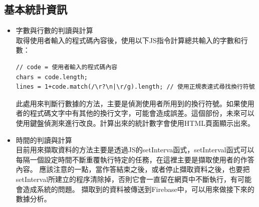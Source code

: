 \subsection{基本統計資訊}
\begin{itemize}
	\item 字數與行數的判讀與計算\\
	取得使用者輸入的程式碼內容後，使用以下JS指令計算總共輸入的字數和行數：

\begin{lstlisting}[caption=js字數與行數的判讀與計算]
// code = 使用者輸入的程式碼內容
chars = code.length;
lines = 1+code.match(/\r?\n|\r/g).length; // 使用正規表達式尋找換行符號
\end{lstlisting}
此處用來判斷行數據的方法，主要是偵測使用者所用到的換行符號。如果使用者的程式碼文字中有其他的換行文字，可能會造成誤差。這個部份，未來可以使用鍵盤偵測來進行改良。計算出來的統計數字會使用HTML頁面顯示出來。

\item 時間的判讀與計算\\
目前用來擷取資料的方法主要是透過JS的setInterva函式，setInterval函式可以每隔一個設定時間不斷重覆執行特定的任務，在這裡主要是擷取使用者的作答內容。\cite{name20}
應該注意的一點，當作答結束之後，或者停止擷取資料之後，也要把setInterval所建立的程序清除掉，否則它會一直留在網頁中不斷執行，有可能會造成系統的問題。
擷取到的資料被傳送到Firebase中，可以用來做接下來的數據分析。
\end{itemize}
